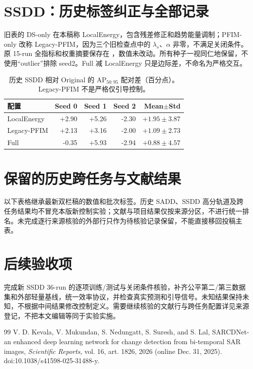 \documentclass[UTF8,fontset=fandol,10pt]{ctexart}
\begin{document}
\section{SSDD：历史标签纠正与全部记录}
旧表的 DS-only 在本稿称 LocalEnergy，包含残差修正和趋势能量调制；PFIM-only 改称 Legacy-PFIM，因为三个旧检查点中的 $\lambda_s$、$\alpha$ 非零，不满足关闭条件。原 15-run 全指标和权重摘要保存在 ，数值未改动。所有种子一视同仁地保留，不使用“outlier”排除 seed2。Full 减 LocalEnergy 只是边际差，不命名为严格交互。

\begin{table}[!htbp]
\centering\small
\caption{历史 SSDD 相对 Original 的 AP$_{50:95}$ 配对差（百分点）。Legacy-PFIM 不是严格仅引导控制。}
\begin{tabular}{lrrrr}
\toprule
配置 & Seed 0 & Seed 1 & Seed 2 & Mean$\pm$Std\\
\midrule
LocalEnergy & +2.90 & +5.26 & -2.30 & $+1.95\pm3.87$\\
Legacy-PFIM & +2.13 & +3.16 & -2.00 & $+1.09\pm2.73$\\
Full & -0.35 & +5.93 & -2.94 & $+0.88\pm4.57$\\
\bottomrule
\end{tabular}
\end{table}
\FloatBarrier

\section{保留的历史跨任务与文献结果}
以下表格继承最新双栏稿的数值和批次标签。历史 SADD、SSDD 高分轨道及跨任务结果均不冒充本版新控制实验；文献与项目结果仅按来源分区，不进行统一排名。未完成逐行来源核验的外部行只作为待核验记录保留，不能直接移回投稿主表。

\FloatBarrier
\section{后续验收项}
完成新 SSDD 36-run 的逐项训练/测试与关闭条件核验，补齐公平第二/第三数据集和外部轻量基线，统一效率协议，并检查真实预测和引导信号。未知结果保持未知，不根据中间结果修改控制定义。需要继续核验的文献行与跨任务配置详见来源登记，不把本文编辑等同于实验实施。
\begin{thebibliography}{99}
V. D. Kevala, V. Mukundan, S. Nedungatt, S. Suresh, and S. Lal, SARCDNet-an enhanced deep learning network for change detection from bi-temporal SAR images, \emph{Scientific Reports}, vol. 16, art. 1826, 2026 (online Dec. 31, 2025). doi:10.1038/s41598-025-31488-y.
\end{thebibliography}
\end{document}
